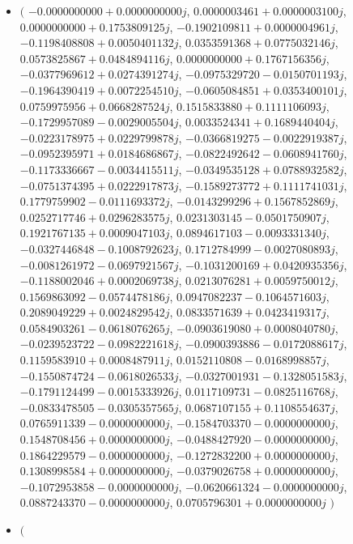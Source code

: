 \documentclass[14pt,a4paper]{article}
\begin{document}
\begin{itemize}
\item
$\big($
$-0.0000000000+0.0000000000j$, $0.0000003461+0.0000003100j$, $0.0000000000+0.1753809125j$, $-0.1902109811+0.0000004961j$, $-0.1198408808+0.0050401132j$, $0.0353591368+0.0775032146j$, $0.0573825867+0.0484894116j$, $0.0000000000+0.1767156356j$, $-0.0377969612+0.0274391274j$, $-0.0975329720-0.0150701193j$, $-0.1964390419+0.0072254510j$, $-0.0605084851+0.0353400101j$, $0.0759975956+0.0668287524j$, $0.1515833880+0.1111106093j$, $-0.1729957089-0.0029005504j$, $0.0033524341+0.1689440404j$, $-0.0223178975+0.0229799878j$, $-0.0366819275-0.0022919387j$, $-0.0952395971+0.0184686867j$, $-0.0822492642-0.0608941760j$, $-0.1173336667-0.0034415511j$, $-0.0349535128+0.0788932582j$, $-0.0751374395+0.0222917873j$, $-0.1589273772+0.1111741031j$, $0.1779759902-0.0111693372j$, $-0.0143299296+0.1567852869j$, $0.0252717746+0.0296283575j$, $0.0231303145-0.0501750907j$, $0.1921767135+0.0009047103j$, $0.0894617103-0.0093331340j$, $-0.0327446848-0.1008792623j$, $0.1712784999-0.0027080893j$, $-0.0081261972-0.0697921567j$, $-0.1031200169+0.0420935356j$, $-0.1188002046+0.0002069738j$, $0.0213076281+0.0059750012j$, $0.1569863092-0.0574478186j$, $0.0947082237-0.1064571603j$, $0.2089049229+0.0024829542j$, $0.0833571639+0.0423419317j$, $0.0584903261-0.0618076265j$, $-0.0903619080+0.0008040780j$, $-0.0239523722-0.0982221618j$, $-0.0900393886-0.0172088617j$, $0.1159583910+0.0008487911j$, $0.0152110808-0.0168998857j$, $-0.1550874724-0.0618026533j$, $-0.0327001931-0.1328051583j$, $-0.1791124499-0.0015333926j$, $0.0117109731-0.0825116768j$, $-0.0833478505-0.0305357565j$, $0.0687107155+0.1108554637j$, $0.0765911339-0.0000000000j$, $-0.1584703370-0.0000000000j$, $0.1548708456+0.0000000000j$, $-0.0488427920-0.0000000000j$, $0.1864229579-0.0000000000j$, $-0.1272832200+0.0000000000j$, $0.1308998584+0.0000000000j$, $-0.0379026758+0.0000000000j$, $-0.1072953858-0.0000000000j$, $-0.0620661324-0.0000000000j$, $0.0887243370-0.0000000000j$, $0.0705796301+0.0000000000j$
$\big)$
\item
$\big($

\end{itemize}
\end{document}
